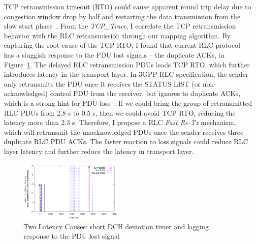 TCP retransmission timeout (RTO) could cause apparent round trip delay due to congestion window drop by half and restarting the data transmission from the slow start phase~\cite{tcp.rto}. From the \emph{TCP\_{}Trace}, I correlate the TCP retransmission behavior with the RLC retransmission through our mapping algorithm. By capturing the root cause of the TCP RTO, I found that current RLC protocol has a sluggish response to the PDU lost signals -- the duplicate ACKs, in Figure~\ref{fig:RLC.Dup.Ack}. The delayed RLC retransmission PDUs leads TCP RTO, which further introduces latency in the transport layer. In 3GPP RLC specification, the sender only retransmits the PDU once it receives the STATUS LIST (or non-acknowledged) control PDU from the receiver, but ignores to duplicate ACKs, which is a strong hint for PDU loss~\cite{spec-3G-RLC}. If we could bring the group of retransmitted RLC PDUs from 2.8 s to 0.5 s, then we could avoid TCP RTO, reducing the latency more than 2.3 s. Therefore, I propose a RLC \textit{Fast Re-Tx} mechanism, which will retransmit the unacknowledged PDUs once the sender receives three duplicate RLC PDU ACKs. The faster reaction to loss signals could reduce RLC layer latency and further reduce the latency in transport layer.

\begin{figure}
\centering
\includegraphics[width=0.45\textwidth]{figs/rlc_dup_ack.png}
\caption{Two Latency Causes: short DCH demotion timer and lagging response to the PDU lost signal}
\label{fig:RLC.Dup.Ack}
\end{figure}

\label{sec:crossAnalysis}


